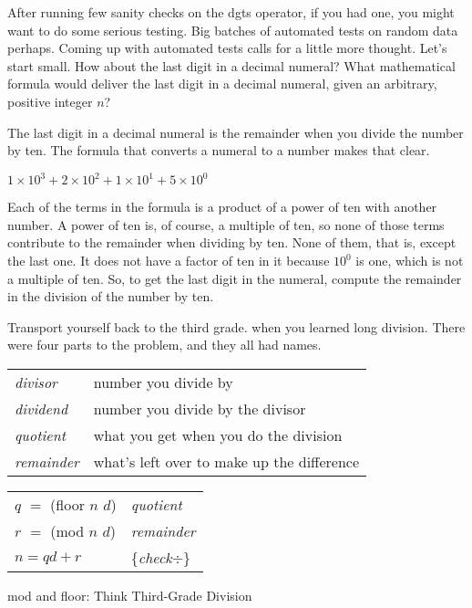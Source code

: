 After running few sanity checks on the dgts operator,
if you had one, you might want to do some serious testing.
Big batches of automated tests on random data perhaps.
Coming up with automated tests calls for a little more thought.
Let's start small. How about the last digit in a decimal numeral?
What mathematical formula would deliver the last digit in a
decimal numeral, given an arbitrary, positive integer $n$?

The last digit in a decimal numeral is the remainder when you divide
the number by ten. The formula that converts a numeral to a number
makes that clear.
\begin{center}
$1 \times 10^3 + 2 \times 10^2 + 1 \times 10^1 + 5 \times 10^0$
\end{center}

Each of the terms in the formula is a product of a power
of ten with another number. A power of ten is, of course,
a multiple of ten, so none of those terms contribute to the remainder
when dividing by ten. None of them, that is, except the last one.
It does not have a factor of ten in it because
$10^0$ is one, which is not a multiple of ten.
So, to get the last digit in the numeral,
compute the remainder in the division of the number by ten.

\begin{aside}
Transport yourself back to the third grade.
when you learned long division.
There were four parts to the problem,
and they all had names.

\begin{tabular}{ll}
\emph{divisor}   & number you divide by \\
\emph{dividend}  & number you divide by the divisor \\
\emph{quotient}  & what you get when you do the division \\
\emph{remainder} & what's left over to make up the difference
\end{tabular}
\begin{center}
\begin{tabular}{ll}
$q$ $=$ (floor $n$ $d$) & \emph{quotient}  \\
$r$ $=$ (mod $n$ $d$)   & \emph{remainder} \\
$n = qd + r$            & \{\emph{check}$\div$\} \\
\end{tabular}
\end{center}
\caption{mod and floor: Think Third-Grade Division}
\label{third-grade-division}
\end{aside}

